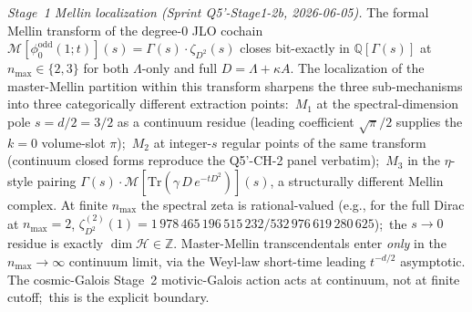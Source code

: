\documentclass[11pt,a4paper]{article}
\theoremstyle{plain}
\theoremstyle{definition}
\newcommand{\Z}{\mathbb{Z}}
\newcommand{\Q}{\mathbb{Q}}
\begin{document}
\emph{Stage~1 Mellin localization (Sprint Q5'-Stage1-2b, 2026-06-05).}  The
formal Mellin transform of the degree-0 JLO cochain
$\mathcal{M}[\phi_0^{\mathrm{odd}}(1; t)](s) = \Gamma(s) \cdot
\zeta_{D^2}(s)$ closes bit-exactly in $\Q[\Gamma(s)]$ at $n_{\max}
\in \{2, 3\}$ for both $\Lambda$-only and full $D = \Lambda +
\kappa A$.  The localization of the master-Mellin partition within
this transform sharpens the three sub-mechanisms into three
categorically different extraction points:\ $M_1$ at the
spectral-dimension pole $s = d/2 = 3/2$ as a continuum residue
(leading coefficient $\sqrt{\pi}/2$ supplies the $k = 0$ volume-slot
$\pi$);\ $M_2$ at integer-$s$ regular points of the same transform
(continuum closed forms reproduce the Q5'-CH-2 panel verbatim);\
$M_3$ in the $\eta$-style pairing
$\Gamma(s) \cdot \mathcal{M}[\mathrm{Tr}(\gamma\,D\,e^{-tD^2})](s)$, a
structurally different Mellin complex.  At finite $n_{\max}$ the
spectral zeta is rational-valued (e.g., for the full Dirac at
$n_{\max} = 2$, $\zeta_{D^2}^{(2)}(1) = 1\,978\,465\,196\,515\,232/
532\,976\,619\,280\,625$);\ the $s \to 0$ residue is exactly
$\dim \mathcal{H} \in \Z$.  Master-Mellin transcendentals enter
\emph{only} in the $n_{\max} \to \infty$ continuum limit, via the
Weyl-law short-time leading $t^{-d/2}$ asymptotic.  The
cosmic-Galois Stage~2 motivic-Galois action acts at continuum, not
at finite cutoff;\ this is the explicit boundary.
\end{document}
